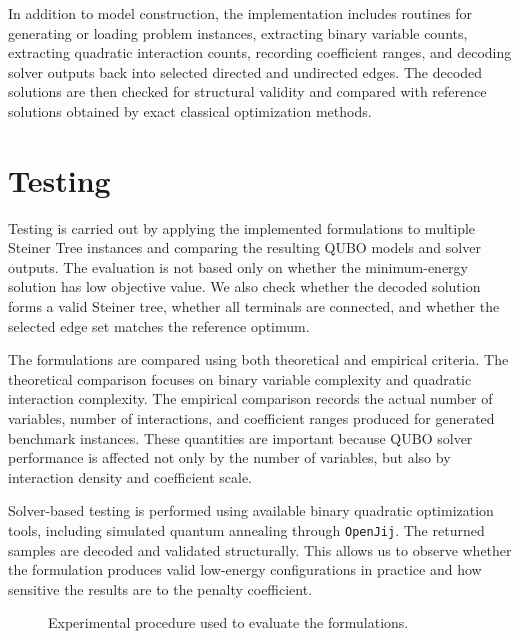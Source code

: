 \documentclass[a4paper,12pt]{report}
\begin{document}
In addition to model construction, the implementation includes routines for generating or loading problem instances, extracting binary variable counts, extracting quadratic interaction counts, recording coefficient ranges, and decoding solver outputs back into selected directed and undirected edges. The decoded solutions are then checked for structural validity and compared with reference solutions obtained by exact classical optimization methods.

\section{Testing}

Testing is carried out by applying the implemented formulations to multiple Steiner Tree instances and comparing the resulting QUBO models and solver outputs. The evaluation is not based only on whether the minimum-energy solution has low objective value. We also check whether the decoded solution forms a valid Steiner tree, whether all terminals are connected, and whether the selected edge set matches the reference optimum.

The formulations are compared using both theoretical and empirical criteria. The theoretical comparison focuses on binary variable complexity and quadratic interaction complexity. The empirical comparison records the actual number of variables, number of interactions, and coefficient ranges produced for generated benchmark instances. These quantities are important because QUBO solver performance is affected not only by the number of variables, but also by interaction density and coefficient scale.

Solver-based testing is performed using available binary quadratic optimization tools, including simulated quantum annealing through \texttt{OpenJij}. The returned samples are decoded and validated structurally. This allows us to observe whether the formulation produces valid low-energy configurations in practice and how sensitive the results are to the penalty coefficient.

\begin{figure}[htbp]
\centering
{}
\caption{Experimental procedure used to evaluate the formulations.}
\label{fig:experimental_workflow}
\end{figure}
\end{document}

